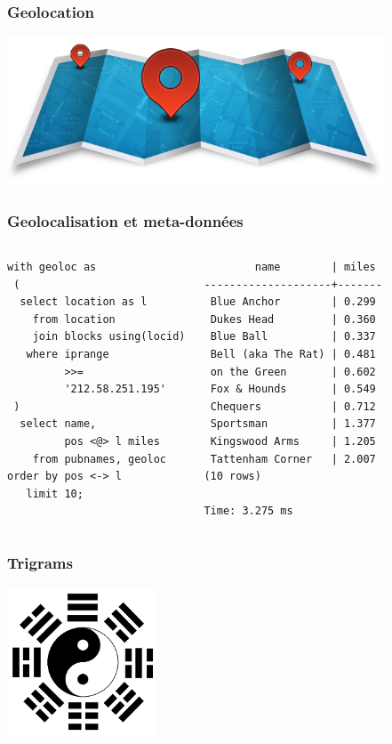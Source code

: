 \documentclass{beamer}
\begin{document}
\begin{frame}[fragile]
  \frametitle{Geolocation}

\begin{center}
  \includegraphics[height=12em]{geolocation.png}
\end{center}
\end{frame}

\begin{frame}[fragile]
  \frametitle{Geolocalisation et meta-données}

\begin{columns}
\begin{verbatim}
with geoloc as
 (
  select location as l
    from location
    join blocks using(locid)
   where iprange
         >>=
         '212.58.251.195'
 )
  select name,
         pos <@> l miles
    from pubnames, geoloc
order by pos <-> l
   limit 10;
\end{verbatim}  
\begin{verbatim}
        name        | miles 
--------------------+-------
 Blue Anchor        | 0.299
 Dukes Head         | 0.360
 Blue Ball          | 0.337
 Bell (aka The Rat) | 0.481
 on the Green       | 0.602
 Fox & Hounds       | 0.549
 Chequers           | 0.712
 Sportsman          | 1.377
 Kingswood Arms     | 1.205
 Tattenham Corner   | 2.007
(10 rows)

Time: 3.275 ms
\end{verbatim}  
\end{columns}
\end{frame}

\begin{frame}[fragile]
  \frametitle{Trigrams}

\begin{center}
  \includegraphics[height=12em]{trigramme.png}
\end{center}
\end{frame}
\end{document}
